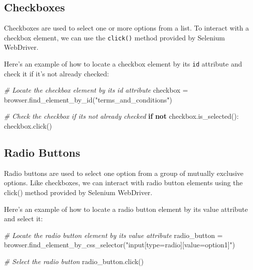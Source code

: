 \documentclass[
  paper=a4,
  ,captions=tableheading
]{scrartcl}
\newenvironment{Shaded}{}{}
\newcommand{\CommentTok}[1]{\textcolor[rgb]{0.38,0.63,0.69}{\textit{#1}}}
\newcommand{\ControlFlowTok}[1]{\textcolor[rgb]{0.00,0.44,0.13}{\textbf{#1}}}
\newcommand{\KeywordTok}[1]{\textcolor[rgb]{0.00,0.44,0.13}{\textbf{#1}}}
\newcommand{\NormalTok}[1]{#1}
\newcommand{\OperatorTok}[1]{\textcolor[rgb]{0.40,0.40,0.40}{#1}}
\newcommand{\StringTok}[1]{\textcolor[rgb]{0.25,0.44,0.63}{#1}}
\begin{document}
\hypertarget{checkboxes}{%
\subsection{Checkboxes}\label{checkboxes}}

Checkboxes are used to select one or more options from a list. To
interact with a checkbox element, we can use the \texttt{click()} method
provided by Selenium WebDriver.

Here's an example of how to locate a checkbox element by its \texttt{id}
attribute and check it if it's not already checked:

\begin{Shaded}
\begin{Highlighting}[]
\CommentTok{\# Locate the checkbox element by its \textquotesingle{}id\textquotesingle{} attribute}
\NormalTok{checkbox }\OperatorTok{=}\NormalTok{ browser.find\_element\_by\_id(}\StringTok{"terms\_and\_conditions"}\NormalTok{)}

\CommentTok{\# Check the checkbox if it\textquotesingle{}s not already checked}
\ControlFlowTok{if} \KeywordTok{not}\NormalTok{ checkbox.is\_selected():}
\NormalTok{    checkbox.click()}
\end{Highlighting}
\end{Shaded}

\hypertarget{radio-buttons}{%
\subsection{Radio Buttons}\label{radio-buttons}}

Radio buttons are used to select one option from a group of mutually
exclusive options. Like checkboxes, we can interact with radio button
elements using the click() method provided by Selenium WebDriver.

Here's an example of how to locate a radio button element by its value
attribute and select it:

\begin{Shaded}
\begin{Highlighting}[]

\CommentTok{\# Locate the radio button element by its \textquotesingle{}value\textquotesingle{} attribute}
\NormalTok{radio\_button }\OperatorTok{=}\NormalTok{ browser.find\_element\_by\_css\_selector(}\StringTok{"input[type=\textquotesingle{}radio\textquotesingle{}][value=\textquotesingle{}option1\textquotesingle{}]"}\NormalTok{)}

\CommentTok{\# Select the radio button}
\NormalTok{radio\_button.click()}

\end{Highlighting}
\end{Shaded}
\end{document}

